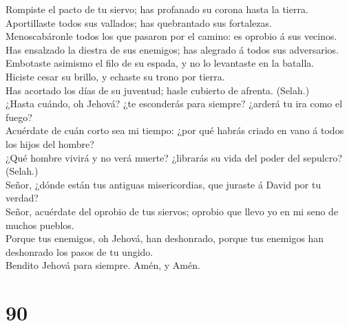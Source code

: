  Rompiste el pacto de tu siervo; has profanado su corona
hasta la tierra.\\
 Aportillaste todos sus vallados; has quebrantado sus
fortalezas.\\
 Menoscabáronle todos los que pasaron por el camino: es
oprobio á sus vecinos.\\
 Has ensalzado la diestra de sus enemigos; has alegrado á
todos sus adversarios.\\
 Embotaste asimismo el filo de su espada, y no lo
levantaste en la batalla.\\
 Hiciste cesar su brillo, y echaste su trono por tierra.\\
 Has acortado los días de su juventud; hasle cubierto de
afrenta. (Selah.)\\
 ¿Hasta cuándo, oh Jehová? ¿te esconderás para siempre?
¿arderá tu ira como el fuego?\\
 Acuérdate de cuán corto sea mi tiempo: ¿por qué habrás
criado en vano á todos los hijos del hombre?\\
 ¿Qué hombre vivirá y no verá muerte? ¿librarás su vida del
poder del sepulcro? (Selah.)\\
 Señor, ¿dónde están tus antiguas misericordias, que
juraste á David por tu verdad?\\
 Señor, acuérdate del oprobio de tus siervos; oprobio que
llevo yo en mi seno de muchos pueblos.\\
 Porque tus enemigos, oh Jehová, han deshonrado, porque tus
enemigos han deshonrado los pasos de tu ungido.\\
 Bendito Jehová para siempre. Amén, y Amén.

\hypertarget{section-89}{%
\section{90}\label{section-89}}

